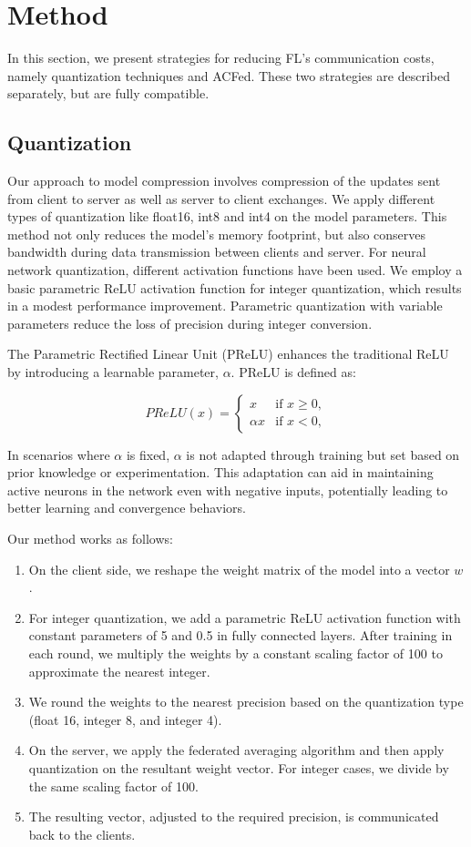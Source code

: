 \documentclass{article}
\begin{document}
\section{Method}

In this section, we present strategies for reducing FL’s communication costs, namely quantization techniques and ACFed. These two strategies are described separately, but are fully compatible.

\subsection{Quantization}

Our approach to model compression involves compression of the updates sent from client to server as well as server to client exchanges. We apply different types of quantization like float16, int8 and int4 on the model parameters. This method not only reduces the model's memory footprint, but also conserves bandwidth during data transmission between clients and server. For neural network quantization, different activation functions have been used. We employ a basic parametric ReLU activation function for integer quantization, which results in a modest performance improvement. Parametric quantization with variable parameters reduce the loss of precision during integer conversion.

The Parametric Rectified Linear Unit (PReLU) enhances the traditional ReLU by introducing a learnable parameter, $\alpha$. PReLU is defined as:

\[
PReLU(x) = \begin{cases} 
x & \text{if } x \geq 0, \\
\alpha x & \text{if } x < 0,
\end{cases}
\]

In scenarios where $\alpha$ is fixed, $\alpha$ is not adapted through training but set based on prior knowledge or experimentation. This adaptation can aid in maintaining active neurons in the network even with negative inputs, potentially leading to better learning and convergence behaviors.

Our method works as follows:
\begin{enumerate}
    \item On the client side, we reshape the weight matrix of the model into a vector \( w \).
    \item For integer quantization, we add a parametric ReLU activation function with constant parameters of 5 and 0.5 in fully connected layers. After training in each round, we multiply the weights by a constant scaling factor of 100 to approximate the nearest integer.
    \item We round the weights to the nearest precision based on the quantization type (float 16, integer 8, and integer 4).
    \item On the server, we apply the federated averaging algorithm and then apply quantization on the resultant weight vector. For integer cases, we divide by the same scaling factor of 100.
    \item The resulting vector, adjusted to the required precision, is communicated back to the clients.
\end{enumerate}
\end{document}
